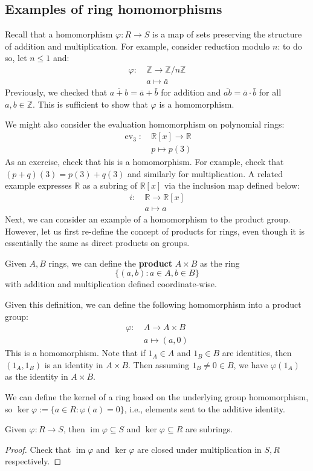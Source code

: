 \documentclass{article}
\theoremstyle{plain}
\newcommand{\R}{\mathbb{R}}
\newcommand{\Z}{\mathbb{Z}}
\newcommand{\on}[1]{\operatorname{#1}}
\begin{document}
\subsection{Examples of ring homomorphisms}
Recall that a homomorphism $\varphi : R \to S$ is a map of sets preserving the structure of addition and multiplication. For example, consider reduction modulo $n$: to do so, let $n \le 1$ and:
\begin{align*}
\varphi : \ &\Z \to \Z/n\Z \\
&a \mapsto \bar{a}
\end{align*}
Previously, we checked that $\overline{a+b} = \bar{a} + \bar{b}$ for addition and $\overline{ab} = \bar{a}\cdot\bar{b}$ for all $a,b \in \Z$. This is sufficient to show that $\varphi$ is a homomorphism.

We might also consider the evaluation homomorphism on polynomial rings:
\begin{align*}
\on{ev}_3 : \ &\R[x] \to \R \\
&p \mapsto p(3)
\end{align*}
As an exercise, check that his is a homomorphism. For example, check that $(p+q)(3) = p(3) + q(3)$ and similarly for multiplication. A related example expresses $\R$ as a subring of $\R[x]$ via the inclusion map defined below:
\begin{align*}
i : \ &\R \to \R[x] \\
&a \mapsto a
\end{align*}
Next, we can consider an example of a homomorphism to the product group. However, let us first re-define the concept of products for rings, even though it is essentially the same as direct products on groups.
\begin{definition}{}{}
Given $A,B$ rings, we can define the \textbf{product} $A \times B$ as the ring
$$\{ (a,b) : a\in A, b \in B \}$$
with addition and multiplication defined coordinate-wise.
\end{definition}
Given this definition, we can define the following homomorphism into a product group:
\begin{align*}
\varphi : \ &A \to A\times B \\
&a \mapsto (a,0)
\end{align*}
This is a homomorphism. Note that if $1_A \in A$ and $1_B \in B$ are identities, then $(1_A,1_B)$ is an identity in $A\times B$. Then assuming $1_B \ne 0 \in B$, we have $\varphi(1_A)$ as the identity in $A \times B$.

We can define the kernel of a ring based on the underlying group homomorphism, so $\on{ker}\varphi := \{ a\in R : \varphi(a) = 0 \}$, i.e., elements sent to the additive identity.
\begin{theorem}{}{}
Given $\varphi : R \to S$, then $\on{im}\varphi \subseteq S$ and $\on{ker}\varphi \subseteq R$ are subrings.
\end{theorem}
\begin{proof}
Check that $\on{im}\varphi$ and $\on{ker}\varphi$ are closed under multiplication in $S,R$ respectively.
\end{proof}
\end{document}
